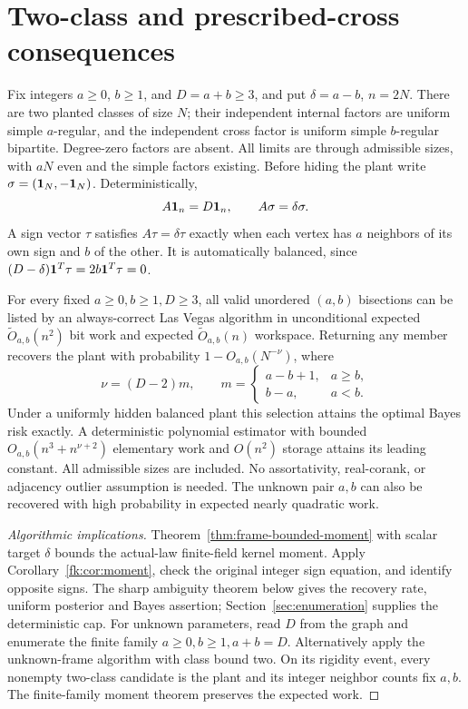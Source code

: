 \section{Two-class and prescribed-cross consequences}\label{sec:results}
Fix integers $a\ge0$, $b\ge1$, and $D=a+b\ge3$, and put
$\delta=a-b$, $n=2N$. There are two planted classes of size $N$;
their independent internal factors are uniform simple $a$-regular,
and the independent cross factor is uniform simple $b$-regular
bipartite. Degree-zero factors are absent. All limits are through
admissible sizes, with $aN$ even and the simple factors existing.
Before hiding the plant write $\sigma=(\mathbf 1_N,-\mathbf 1_N)$.
Deterministically,
\begin{equation}\label{eq:planted}
 A\mathbf 1_n=D\mathbf 1_n,\qquad A\sigma=\delta\sigma.
\end{equation}
A sign vector $\tau$ satisfies $A\tau=\delta\tau$ exactly when
each vertex has $a$ neighbors of its own sign and $b$ of the other.
It is automatically balanced, since $(D-\delta)\mathbf 1^T\tau=2b\mathbf 1^T\tau=0$.

\begin{theorem}\label{thm:main-recovery}
For every fixed $a\ge0,b\ge1,D\ge3$, all valid unordered $(a,b)$
bisections can be listed by an always-correct Las Vegas algorithm in
unconditional expected $\widetilde O_{a,b}(n^2)$ bit work and
expected $\widetilde O_{a,b}(n)$ workspace. Returning any member
recovers the plant with probability $1-O_{a,b}(N^{-\nu})$, where
\[
 \nu=(D-2)m,\qquad
 m=\begin{cases}a-b+1,&a\ge b,\\b-a,&a<b.\end{cases}
\]
Under a uniformly hidden balanced plant this selection attains the
optimal Bayes risk exactly. A deterministic polynomial estimator with
bounded $O_{a,b}(n^3+n^{\nu+2})$ elementary work and $O(n^2)$ storage
attains its leading constant. All admissible sizes are included.
No assortativity, real-corank, or adjacency outlier assumption is needed.
The unknown pair $a,b$ can also be recovered with high probability
in expected nearly quadratic work.
\end{theorem}
\begin{proof}[Algorithmic implications]
Theorem~\ref{thm:frame-bounded-moment} with scalar target $\delta$
bounds the actual-law finite-field kernel moment. Apply
Corollary~\ref{fk:cor:moment}, check the original integer sign
equation, and identify opposite signs. The sharp ambiguity theorem
below gives the recovery rate, uniform posterior and Bayes assertion;
Section~\ref{sec:enumeration} supplies the deterministic cap.
For unknown parameters, read $D$ from the graph and enumerate the
finite family $a\ge0,b\ge1,a+b=D$. Alternatively apply the unknown-frame
algorithm with class bound two. On its rigidity event, every nonempty
two-class candidate is the plant and its integer neighbor counts fix
$a,b$. The finite-family moment theorem preserves the expected work.
\end{proof}

